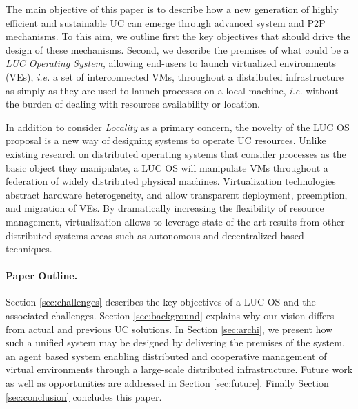 \medskip
The main objective of this paper is to describe  how a new
generation of highly efficient and sustainable UC can emerge through advanced
system and P2P mechanisms. To this aim, we outline first the key objectives that should drive 
the design of these mechanisms. Second, we describe the premises of what could be a
\emph{LUC Operating System}, allowing end-users to launch virtualized
environments (VEs), \textit{i.e.} a set of interconnected VMs, throughout a
distributed infrastructure as simply as they are used to launch processes on a
local machine, \textit{i.e.}  without the burden of dealing with resources
availability or location. 

In addition to consider \emph{Locality} as a primary concern, the novelty of the LUC OS
proposal is a new way of designing systems to operate UC resources.  Unlike existing
research on distributed operating systems that consider processes as the basic object they
manipulate, a LUC OS will manipulate VMs throughout a federation of widely distributed
physical machines. Virtualization technologies abstract hardware heterogeneity, and allow
transparent deployment, preemption, and migration of VEs.
By dramatically increasing the flexibility of resource management, virtualization 
allows to leverage state-of-the-art results from other distributed
systems areas such as autonomous and decentralized-based techniques. 



\paragraph{Paper Outline.} 
Section \ref{sec:challenges} describes the key objectives of a LUC OS and the associated challenges. 
Section \ref{sec:background} explains why our vision differs from actual and previous UC solutions. In
Section \ref{sec:archi}, we present how such a unified system may be designed
by delivering the premises of the \discovery system, an agent based system
enabling distributed and cooperative management of virtual environments through a
large-scale distributed infrastructure.
Future work as well as opportunities  are addressed in Section \ref{sec:future}. Finally Section
\ref{sec:conclusion} concludes this paper. 
